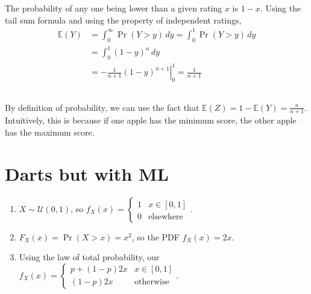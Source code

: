 \documentclass{article}
\newcommand{\E}{\mathbb{E}}
\begin{document}
The probability of any one being lower than a given rating \(x\) is \(1 - x\).
Using the tail sum formula and using the property of independent ratings,
\begin{align}
    \E(Y) &= \int_0^\infty \Pr(Y > y) \, dy = \int_0^1 \Pr(Y > y) \, dy \\
    &= \int_0^1 (1 - y)^n \, dy \\
    &= \left.-\frac{1}{n + 1} (1 - y)^{n + 1}\right|_0^1 = \frac{1}{n + 1}
\end{align}

\subsection{}

By definition of probability, we can use the fact that \(\E(Z) = 1 - \E(Y) = \frac{n}{n + 1}\).
Intuitively, this is because if one apple has the minimum score, the other apple has the maximum score.

\section{Darts but with ML}

\begin{enumerate}
    \item \(X \sim \mathcal{U}(0, 1)\), so \(f_X(x) =
    \begin{cases}
        1 & x \in [0, 1] \\
        0 & \text{elsewhere}     
    \end{cases}\).
    \item \(F_X(x) = \Pr(X > x) = x^2\), so the PDF \(f_X(x) = 2x\).
    \item Using the law of total probability, our \(f_{X}(x) =
    \begin{cases}
        p + (1 - p) 2x & x \in [0, 1] \\     
        (1 - p) 2x & \text{otherwise}    
    \end{cases}\).
\end{enumerate}


\subsection{}
\end{document}
